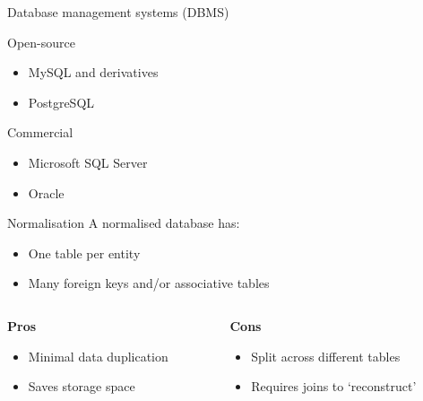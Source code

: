 \begin{frame}{Database management systems (DBMS)}
    \begin{block}{Open\hyp{}source}
        \begin{itemize}
            \item MySQL and derivatives
            \item PostgreSQL
        \end{itemize}
    \end{block}
    \vfill
    \begin{block}{Commercial}
        \begin{itemize}
            \item Microsoft SQL Server
            \item Oracle
        \end{itemize}
    \end{block}
\end{frame}

\begin{frame}{Normalisation}
    A normalised database has:\vspace{-1ex}
    \begin{itemize}
        \item One table per entity
        \item Many foreign keys and/or associative tables
    \end{itemize}
    \vfill\pause
    \begin{columns}[t]
        \begin{column}{0.5\textwidth}
            \begin{center}
                \textbf{Pros}
            \end{center}
            \vspace{-1ex}
            \begin{itemize}
                \item Minimal data duplication
                \item Saves storage space
            \end{itemize}
        \end{column}
        \begin{column}{0.5\textwidth}
            \begin{center}
                \textbf{Cons}
            \end{center}
            \vspace{-1ex}
            \begin{itemize}
                \item Split across different tables
                \item Requires joins to ‘reconstruct’
            \end{itemize}
        \end{column}
    \end{columns}
\end{frame}

